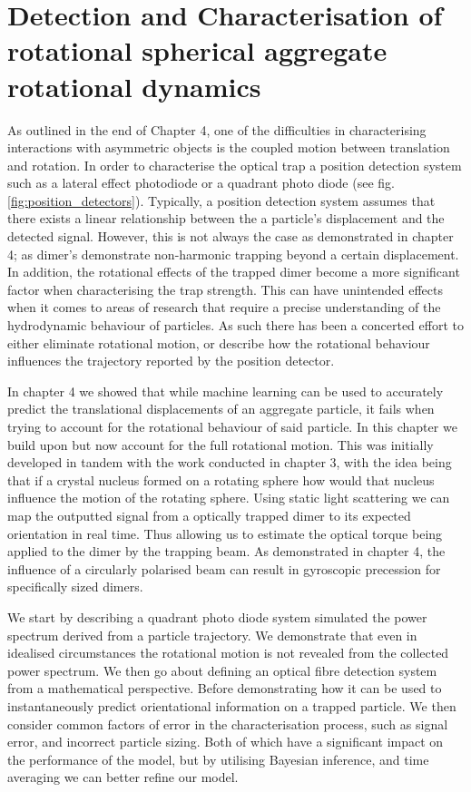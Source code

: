 \chapter{Detection and Characterisation of rotational spherical aggregate rotational dynamics}
\label{chapter:simulated_detection}
As outlined in the end of Chapter 4, one of the difficulties 
in characterising interactions with asymmetric objects is 
the coupled motion between translation and rotation. In order
to characterise the optical trap a position detection system 
such as a lateral effect photodiode or a quadrant photo diode
(see fig.\ref{fig:position_detectors}). Typically, a position 
detection system assumes that there exists a linear relationship 
between the a particle's displacement and the detected signal.
However, this is not always the case as demonstrated in chapter
4; as dimer's demonstrate non-harmonic trapping beyond a certain 
displacement. In addition, the rotational effects of the trapped
dimer become a more significant factor when characterising the 
trap strength. This can have unintended effects when it comes to
areas of research that require a precise understanding of the 
hydrodynamic behaviour of particles. As such there has been a 
concerted effort to either eliminate rotational motion, or describe
how the rotational behaviour influences the trajectory reported 
by the position detector. 

In chapter 4 we showed that while machine learning can be used 
to accurately predict the translational displacements of an 
aggregate particle, it fails when trying to account for the 
rotational behaviour of said particle. In this chapter we 
build upon \cite{BarZiv1997} but now account for the full 
rotational motion. This was initially developed in tandem with 
the work conducted in chapter 3, with the idea being that if a 
crystal nucleus formed on a rotating sphere how would that 
nucleus influence the motion of the rotating sphere. Using 
static light scattering we can map the outputted signal from a 
optically trapped dimer to its expected orientation in real 
time. Thus allowing us to estimate the optical torque being 
applied to the dimer by the trapping beam. As demonstrated 
in chapter 4, the influence of a circularly polarised beam 
can result in gyroscopic precession for specifically sized 
dimers. 

We start by describing a quadrant photo diode system 
simulated the power spectrum derived from a particle 
trajectory. We demonstrate that even in idealised 
circumstances the rotational motion is not revealed 
from the collected power spectrum. We then go about 
defining an optical fibre detection system from a 
mathematical perspective. Before demonstrating how it 
can be used to instantaneously predict orientational 
information on a trapped particle. We then consider 
common factors of error in the characterisation process, 
such as signal error, and incorrect particle sizing. 
Both of which have a significant impact on the performance 
of the model, but by utilising Bayesian inference, and 
time averaging we can better refine our model.   

